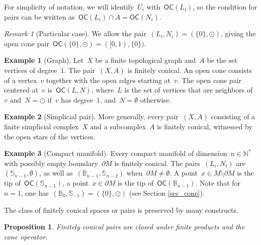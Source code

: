 \documentclass[english,11pt]{article}
\theoremstyle{plain}
\newtheorem{proposition}{Proposition}[section]
\theoremstyle{remark}
\newtheorem{remark}{Remark}[section]
\theoremstyle{definition}
\newtheorem{example}{Example}[section]
\newcommand{\Sp}{\mathbb{S}}
\newcommand{\BB}{\mathbb{B}}
\newcommand{\unit}{\odot}%
\newcommand{\C}[1]{\mathsf{C}(#1)}%
\newcommand{\OC}[1]{\mathsf{OC}(#1)}%
\begin{document}
For simplicity of notation, we will identify~$U_i$ with~$\OC{L_i}$, so the condition for pairs can be written as~$\OC{L_i}\cap A=\OC{N_i}$.

\begin{remark}[Particular case]%
We allow the pair~$(L_i,N_i)=(\{0\},\unit)$, giving the open cone pair~$\OC{\{0\},\unit}=([0,1),\{0\})$.
\end{remark}

\begin{example}[Graph]
Let~$X$ be a finite topological graph and~$A$ be the set vertices of degree~$1$. The pair~$(X,A)$ is finitely conical. An open cone consists of a vertex~$v$ together with the open edges starting at~$v$. The open cone pair centered at~$v$ is~$\OC{L,N}$, where~$L$ is the set of vertices that are neighbors of~$v$ and~$N=\unit$ if~$v$ has degree~$1$, and~$N=\emptyset$ otherwise.
\end{example}


\begin{example}[Simplicial pair]
More generally, every pair~$(X,A)$ consisting of a finite simplicial complex~$X$ and a subcomplex~$A$ is finitely conical, witnessed by the open stars of the vertices.
\end{example}

\begin{example}[Compact manifold]
Every compact manifold of dimension~$n\in\mathbb{N}^{\ast}$ with possibly empty boundary~$\partial M$ is finitely conical. The pairs~$(L_i,N_i)$ are~$(\Sp_{n-1},\emptyset)$, as well as~$(\BB_{n-1},\Sp_{n-2})$ when~$\partial M\neq\emptyset$. A point~$x\in M\setminus \partial M$ is the tip of~$\OC{\Sp_{n-1}}$, a point~$x\in \partial M$ is the tip of~$\OC{\BB_{n-1}}$. Note that for~$n=1$, one has~$(\BB_{0},\Sp_{-1})=(\{0\},\unit)$ (see Section \ref{sec_cone}).
\end{example}


The class of finitely conical spaces or pairs is preserved by many constructs.
\begin{proposition}\label{prop_loc_con_product}
Finitely conical pairs are closed under finite products and the cone operator.
\end{proposition}
\end{document}
